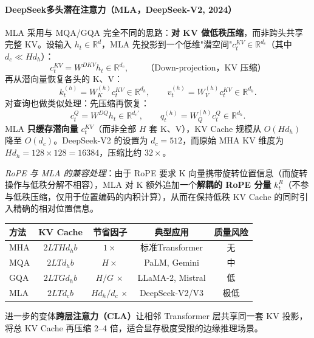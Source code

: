 \documentclass[12pt,a4paper]{article}
\begin{document}
\paragraph{DeepSeek多头潜在注意力（MLA，DeepSeek-V2, 2024）}

MLA 采用与 MQA/GQA 完全不同的思路：\textbf{对 KV 做低秩压缩}，而非跨头共享完整 KV。设输入 $h_t \in \mathbb{R}^d$，MLA 先投影到一个低维"潜空间"$c_t^{KV} \in \mathbb{R}^{d_c}$（其中 $d_c \ll Hd_h$）：
\begin{equation}
c_t^{KV} = W^{DKV} h_t \in \mathbb{R}^{d_c}, \qquad \text{（Down-projection，KV 压缩）}
\end{equation}
再从潜向量恢复各头的 K、V：
\begin{equation}
k_t^{(h)} = W_K^{(h)} c_t^{KV} \in \mathbb{R}^{d_h},\qquad v_t^{(h)} = W_V^{(h)} c_t^{KV} \in \mathbb{R}^{d_h}.
\end{equation}
对查询也做类似处理：先压缩再恢复：
\begin{equation}
c_t^{Q} = W^{DQ} h_t \in \mathbb{R}^{d_c'},\qquad q_t^{(h)} = W_Q^{(h)} c_t^{Q} \in \mathbb{R}^{d_h}.
\end{equation}
MLA \textbf{只缓存潜向量} $c_t^{KV}$（而非全部 $H$ 套 K、V），KV Cache 规模从 $O(H d_h)$ 降至 $O(d_c)$。DeepSeek-V2 的设置为 $d_c = 512$，而原始 MHA KV 维度为 $H d_h = 128 \times 128 = 16384$，压缩比约 $32\times$。

\textit{RoPE 与 MLA 的兼容处理}：由于 RoPE 要求 K 向量携带旋转位置信息（而旋转操作与低秩分解不相容），MLA 对 K 额外追加一个\textbf{解耦的 RoPE 分量} $k_t^{R}$（不参与低秩压缩，仅用于位置编码的内积计算），从而在保持低秩 KV Cache 的同时引入精确的相对位置信息。

\begin{center}
\begin{tabular}{lcccc}
\hline
\textbf{方法} & \textbf{KV Cache} & \textbf{节省因子} & \textbf{典型应用} & \textbf{质量风险} \\
\hline
MHA & $2LTHd_h b$ & $1\times$ & 标准Transformer & 无 \\
MQA & $2LTd_h b$ & $H\times$ & PaLM, Gemini & 中 \\
GQA & $2LTGd_h b$ & $H/G\,\times$ & LLaMA-2, Mistral & 低 \\
MLA & $2LTd_c b$ & $Hd_h/d_c\,\times$ & DeepSeek-V2/V3 & 极低 \\
\hline
\end{tabular}
\end{center}

进一步的变体\textbf{跨层注意力（CLA）}让相邻 Transformer 层共享同一套 KV 投影，将总 KV Cache 再压缩 2--4 倍，适合显存极度受限的边缘推理场景。
\end{document}
